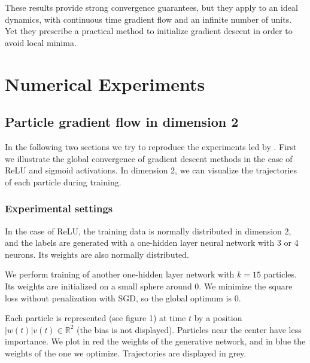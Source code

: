 \documentclass[a4paper, 11pt]{scrartcl}
\begin{document}
{These results provide strong convergence guarantees, but they apply to an ideal dynamics, with continuous time gradient flow and an infinite number of units. Yet they prescribe a practical method to initialize gradient descent in order to avoid local minima.

\section{Numerical Experiments}

\subsection{Particle gradient flow in dimension 2}

In the following two sections we try to reproduce the experiments led by \cite{chizat2018global}. First we illustrate the global convergence of gradient descent methods in the case of ReLU and sigmoid activations. In dimension 2, we can visualize the trajectories of each particle during training.

\subsubsection*{Experimental settings}

In the case of ReLU, the training data is normally distributed in dimension 2, and the labels are generated with a one-hidden layer neural network with 3 or 4 neurons. Its weights are also normally distributed.

We perform training of another one-hidden layer network with $k=15$ particles. Its weights are initialized on a small sphere around 0. We minimize the square loss without penalization with SGD, so the global optimum is 0.

Each particle is represented (see figure 1) at time $t$ by a position $|w(t)| v(t) \in \mathbb{R}^2$ (the bias is not displayed). Particles near the center have less importance. We plot in red the weights of the generative network, and in blue the weights of the one we optimize. Trajectories are displayed in grey.\\

}
\end{document}
